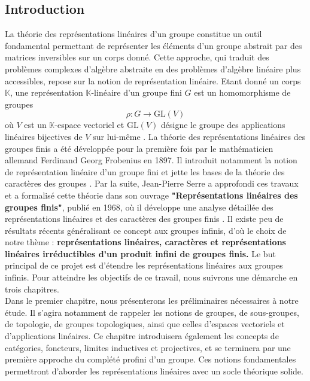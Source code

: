 \documentclass[a4paper, 14pt]{report}
\newcommand{\applyfontsize}{%
	\fontsize{12}{12}\selectfont
}
\begin{document}
\begin{onehalfspace}
\chapter*{Introduction}
{
	\applyfontsize %
La théorie des représentations linéaires d’un groupe constitue un outil fondamental permettant de représenter les éléments d’un groupe abstrait par des matrices inversibles sur un corps donné. Cette approche, qui traduit des problèmes complexes d’algèbre abstraite en des problèmes d’algèbre linéaire plus accessibles, repose sur la notion de représentation linéaire. Etant donné un corps $\mathbb{K}$, une représentation $\mathbb{K}$-linéaire d’un groupe fini $G$ est un homomorphisme de groupes \[ \rho : G \to \text{GL}(V) \]
où $V$ est un $\mathbb{K}$-espace vectoriel et $\text{GL}(V)$ désigne le groupe des applications linéaires bijectives de $V$ sur lui-même \cite{serre1971representation}. 
La théorie des représentations linéaires des groupes finis a été développée pour la première fois par le mathématicien allemand Ferdinand Georg Frobenius en 1897. Il introduit notamment la notion de représentation linéaire d’un groupe fini et jette les bases de la théorie des caractères des groupes \cite{minkowski1911gesammelte}. Par la suite, Jean-Pierre Serre a approfondi ces travaux et a formalisé cette théorie dans son ouvrage \textbf{"Représentations linéaires des groupes finis"}, publié en 1968, où il développe une analyse détaillée des représentations linéaires et des caractères des groupes finis \cite{serre1971representation}. Il existe peu de résultats récents généralisant ce concept aux groupes infinis, d’où le choix de notre thème : \textbf{représentations linéaires, caractères et représentations linéaires irréductibles d’un produit infini de groupes finis.}
Le but principal de ce projet est d’étendre les représentations linéaires aux groupes infinis.
Pour atteindre les objectifs de ce travail, nous suivrons une démarche en trois chapitres.\\
Dans le premier chapitre, nous présenterons les préliminaires nécessaires à notre étude. Il s’agira notamment de rappeler les notions de groupes, de sous-groupes, de topologie, de groupes topologiques, ainsi que celles d’espaces vectoriels et d’applications linéaires. Ce chapitre introduisera également les concepts de catégories, foncteurs, limites inductives et projectives, et se terminera par une première approche du complété profini d’un groupe. Ces notions fondamentales permettront d’aborder les représentations linéaires avec un socle théorique solide.\\
}
\end{onehalfspace}
\end{document}
